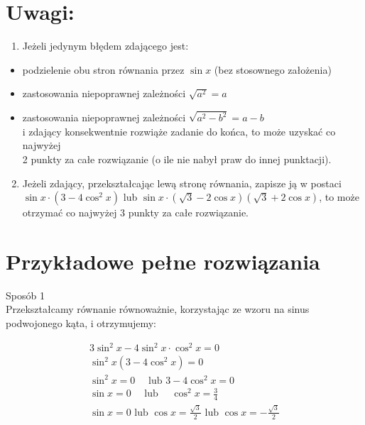 \documentclass[10pt]{article}
\begin{document}
\section*{Uwagi:}
\begin{enumerate}
  \item Jeżeli jedynym błędem zdającego jest:
\end{enumerate}

\begin{itemize}
  \item podzielenie obu stron równania przez $\sin x$ (bez stosownego założenia)
  \item zastosowania niepoprawnej zależności $\sqrt{a^{2}}=a$
  \item zastosowania niepoprawnej zależności $\sqrt{a^{2}-b^{2}}=a-b$\\
i zdający konsekwentnie rozwiąże zadanie do końca, to może uzyskać co najwyżej\\
2 punkty za całe rozwiązanie (o ile nie nabył praw do innej punktacji).
\end{itemize}

\begin{enumerate}
  \setcounter{enumi}{1}
  \item Jeżeli zdający, przekształcając lewą stronę równania, zapisze ją w postaci\\
$\sin x \cdot\left(3-4 \cos ^{2} x\right)$ lub $\sin x \cdot(\sqrt{3}-2 \cos x)(\sqrt{3}+2 \cos x)$, to może otrzymać co najwyżej 3 punkty za całe rozwiązanie.
\end{enumerate}

\section*{Przykładowe pełne rozwiązania}
Sposób 1\\
Przekształcamy równanie równoważnie, korzystając ze wzoru na sinus podwojonego kąta, i otrzymujemy:

$$
\begin{gathered}
3 \sin ^{2} x-4 \sin ^{2} x \cdot \cos ^{2} x=0 \\
\sin ^{2} x\left(3-4 \cos ^{2} x\right)=0 \\
\sin ^{2} x=0 \quad \text { lub } 3-4 \cos ^{2} x=0 \\
\sin x=0 \quad \text { lub } \quad \cos ^{2} x=\frac{3}{4} \\
\sin x=0 \text { lub } \cos x=\frac{\sqrt{3}}{2} \text { lub } \cos x=-\frac{\sqrt{3}}{2}
\end{gathered}
$$
\end{document}
